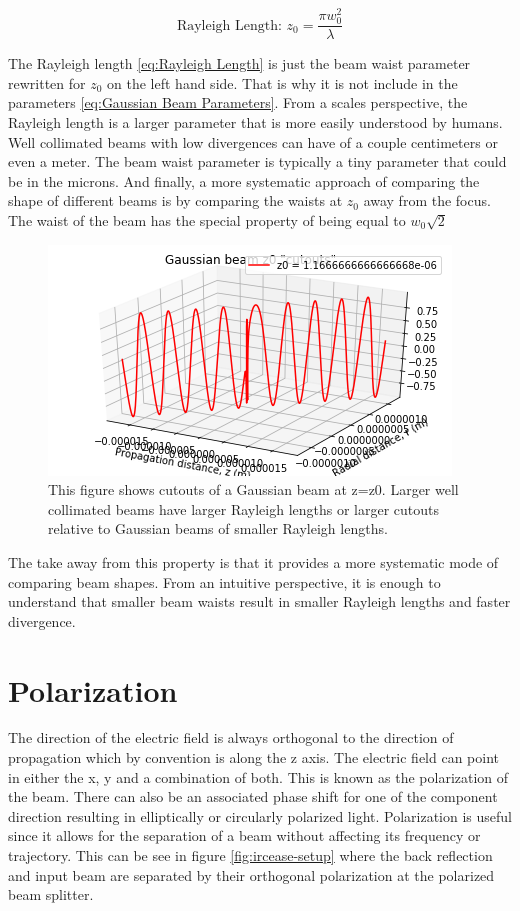 \documentclass[11pt,a4paper]{book}
\begin{document}
		\begin{equation}
		\label{eq:Rayleigh Length}
		\text{Rayleigh Length: } z_0 = \frac{\pi w_0^2}{\lambda}
		\end{equation}
		
		\noindent The Rayleigh length \autoref{eq:Rayleigh Length} is just the beam waist parameter rewritten for $z_0$ on the left hand side. That is why it is not include in the parameters \autoref{eq:Gaussian Beam Parameters}. From a scales perspective, the Rayleigh length is a larger parameter that is more easily understood by humans. Well collimated beams with low divergences can have of a couple centimeters or even a meter. The beam waist parameter is typically a tiny parameter that could be in the microns. And finally, a more systematic approach of comparing the shape of different beams is by comparing the waists at $z_0$ away from the focus. The waist of the beam has the special property of being equal to $w_0\sqrt{2}$
		
		\begin{figure} 
		\centering
		\includegraphics[scale=0.9]{images/chapter-3/Gaussian_beams_waists_at_z0}
		\caption{This figure shows cutouts of a Gaussian beam at z=z0. Larger well collimated beams have larger Rayleigh lengths or larger cutouts relative to Gaussian beams of smaller Rayleigh lengths.}
		\label{fig:Gaussian_beams_waists_at_z0}	
		\end{figure}
		
		The take away from this property is that it provides a more systematic mode of comparing beam shapes. From an intuitive perspective, it is enough to understand that smaller beam waists result in smaller Rayleigh lengths and faster divergence.
		
	\section{Polarization}
		\label{sec:Polarization}
		The direction of the electric field is always orthogonal to the direction of propagation which by convention is along the z axis. The electric field can point in either the x, y and a combination of both. This is known as the polarization of the beam. There can also be an associated phase shift for one of the component direction resulting in elliptically or circularly polarized light. Polarization is useful since it allows for the separation of a beam without affecting its frequency or trajectory. This can be see in figure \autoref{fig:ircease-setup} where the back reflection and input beam are separated by their orthogonal polarization at the polarized beam splitter.
\end{document}
